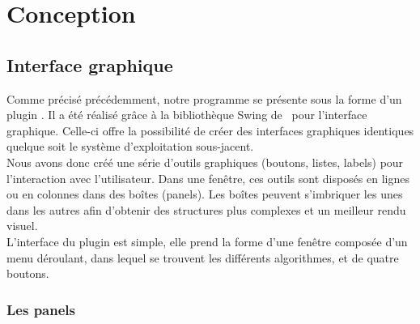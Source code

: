 \documentclass[12pt,a4paper]{report}
\begin{document}
\chapter{Conception}

\section{Interface graphique}

Comme précisé précédemment, notre programme se présente sous la forme d'un plugin \imj. Il a été réalisé grâce à la bibliothèque Swing de \java ~pour l'interface graphique. Celle-ci offre la possibilité de créer des interfaces graphiques identiques quelque soit le système d'exploitation sous-jacent.\\
Nous avons donc créé une série d'outils graphiques (boutons, listes, labels) pour l'interaction avec l'utilisateur. Dans une fenêtre, ces outils sont disposés en lignes ou en colonnes dans des boîtes (panels). Les boîtes peuvent s'imbriquer les unes dans les autres afin d'obtenir des structures plus complexes et un meilleur rendu visuel. \\
L'interface du plugin est simple, elle prend la forme d'une fenêtre composée d'un menu déroulant, dans lequel se trouvent les différents algorithmes, et de quatre boutons. \\

\subsection{Les panels}
\end{document}
